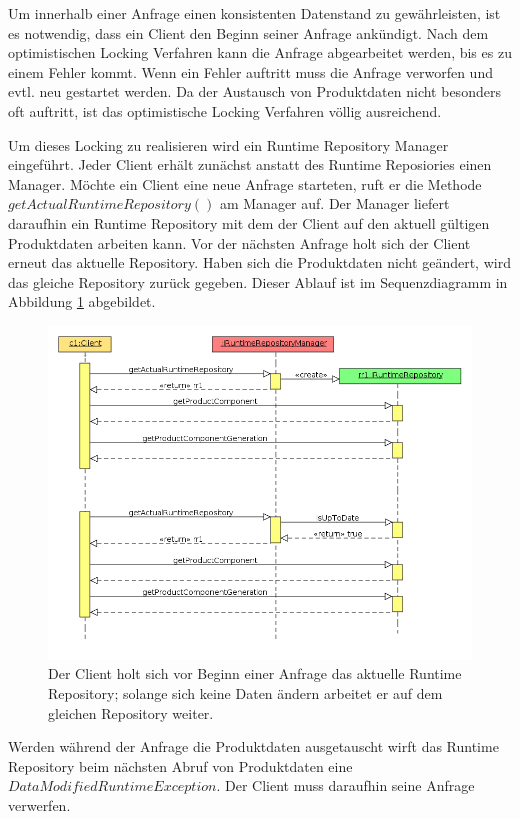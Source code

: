 \documentclass[headsepline=true, footsepline=true]{scrartcl}
\begin{document}
Um innerhalb einer Anfrage einen konsistenten Datenstand zu gewährleisten, ist es
notwendig, dass ein Client den Beginn seiner Anfrage ankündigt. Nach dem
optimistischen Locking Verfahren kann die Anfrage abgearbeitet werden, bis es zu
einem Fehler kommt. Wenn ein Fehler auftritt muss die Anfrage verworfen und
evtl. neu gestartet werden. Da der Austausch von Produktdaten nicht besonders
oft auftritt, ist das optimistische Locking Verfahren völlig ausreichend.

Um dieses Locking zu realisieren wird ein Runtime Repository Manager eingeführt.
Jeder Client erhält zunächst anstatt des Runtime Reposiories einen Manager.
Möchte ein Client eine neue Anfrage starteten, ruft er die Methode
$getActualRuntimeRepository()$ am Manager auf. Der Manager liefert daraufhin ein
Runtime Repository mit dem der Client auf den aktuell gültigen Produktdaten
arbeiten kann. Vor der nächsten Anfrage holt sich der Client erneut das aktuelle
Repository. Haben sich die Produktdaten nicht geändert, wird das gleiche
Repository zurück gegeben. Dieser Ablauf ist im Sequenzdiagramm in
Abbildung \ref{clientSequenceEasy} abgebildet.

\begin{figure}[htb] \centering
\includegraphics[width=13cm]{./pics/clientSequenceEasy.png} \caption{Der Client
holt sich vor Beginn einer Anfrage das aktuelle Runtime Repository; solange sich
keine Daten ändern arbeitet er auf dem gleichen Repository weiter.}
\label{clientSequenceEasy}
\end{figure}

Werden während der Anfrage die Produktdaten ausgetauscht wirft das Runtime
Repository beim nächsten Abruf von
Produktdaten eine $DataModifiedRuntimeException$. Der Client muss
daraufhin seine Anfrage verwerfen.
\end{document}
